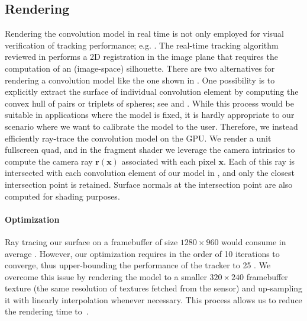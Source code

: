 
\subsection{Rendering}
Rendering the convolution model in real time is not only employed for visual verification of tracking performance; e.g. . The real-time tracking algorithm reviewed in  performs a 2D registration in the image plane that requires the computation of an (image-space) silhouette. There are two alternatives for rendering a  convolution model like the one shown in . One possibility is to explicitly extract the surface of individual convolution element by computing the convex hull of pairs or triplets of spheres; see  and \cite{ando2013liquid}. While this process would be suitable in applications where the model is fixed, it is hardly appropriate to our scenario where we want to calibrate the model to the user. Therefore, we instead efficiently ray-trace the convolution model on the GPU. We render a unit fullscreen quad, and in the fragment shader we leverage the camera intrinsics to compute the camera ray $\mathbf{r}(\mathbf{x})$ associated with each pixel $\mathbf{x}$. Each of this ray is intersected with each convolution element of our model in , and only the closest intersection point is retained.  Surface normals at the intersection point are also computed for shading purposes.

\paragraph{Optimization}
Ray tracing our surface on a framebuffer of size $1280 \times 960$ would consume in average . However, our optimization requires in the order of 10 iterations to converge, thus upper-bounding the performance of the tracker to 25 \FPS{}. We overcome this issue by rendering the model to a smaller $320 \times 240$ framebuffer texture (the same resolution of textures fetched from the sensor) and up-sampling it with linearly interpolation whenever necessary. This process allows us to reduce the rendering time to~.

\endinput

